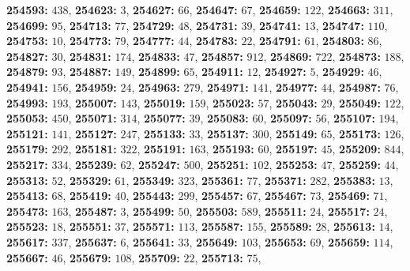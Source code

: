 \textsf{\bfseries 254593:} $438$, \textsf{\bfseries 254623:} $3$, \textsf{\bfseries 254627:} $66$, \textsf{\bfseries 254647:} $67$, \textsf{\bfseries 254659:} $122$, \textsf{\bfseries 254663:} $311$, \textsf{\bfseries 254699:} $95$, \textsf{\bfseries 254713:} $77$, \textsf{\bfseries 254729:} $48$, \textsf{\bfseries 254731:} $39$, \textsf{\bfseries 254741:} $13$, \textsf{\bfseries 254747:} $110$, \textsf{\bfseries 254753:} $10$, \textsf{\bfseries 254773:} $79$, \textsf{\bfseries 254777:} $44$, \textsf{\bfseries 254783:} $22$, \textsf{\bfseries 254791:} $61$, \textsf{\bfseries 254803:} $86$, \textsf{\bfseries 254827:} $30$, \textsf{\bfseries 254831:} $174$, \textsf{\bfseries 254833:} $47$, \textsf{\bfseries 254857:} $912$, \textsf{\bfseries 254869:} $722$, \textsf{\bfseries 254873:} $188$, \textsf{\bfseries 254879:} $93$, \textsf{\bfseries 254887:} $149$, \textsf{\bfseries 254899:} $65$, \textsf{\bfseries 254911:} $12$, \textsf{\bfseries 254927:} $5$, \textsf{\bfseries 254929:} $46$, \textsf{\bfseries 254941:} $156$, \textsf{\bfseries 254959:} $24$, \textsf{\bfseries 254963:} $279$, \textsf{\bfseries 254971:} $141$, \textsf{\bfseries 254977:} $44$, \textsf{\bfseries 254987:} $76$, \textsf{\bfseries 254993:} $193$, \textsf{\bfseries 255007:} $143$, \textsf{\bfseries 255019:} $159$, \textsf{\bfseries 255023:} $57$, \textsf{\bfseries 255043:} $29$, \textsf{\bfseries 255049:} $122$, \textsf{\bfseries 255053:} $450$, \textsf{\bfseries 255071:} $314$, \textsf{\bfseries 255077:} $39$, \textsf{\bfseries 255083:} $60$, \textsf{\bfseries 255097:} $56$, \textsf{\bfseries 255107:} $194$, \textsf{\bfseries 255121:} $141$, \textsf{\bfseries 255127:} $247$, \textsf{\bfseries 255133:} $33$, \textsf{\bfseries 255137:} $300$, \textsf{\bfseries 255149:} $65$, \textsf{\bfseries 255173:} $126$, \textsf{\bfseries 255179:} $292$, \textsf{\bfseries 255181:} $322$, \textsf{\bfseries 255191:} $163$, \textsf{\bfseries 255193:} $60$, \textsf{\bfseries 255197:} $45$, \textsf{\bfseries 255209:} $844$, \textsf{\bfseries 255217:} $334$, \textsf{\bfseries 255239:} $62$, \textsf{\bfseries 255247:} $500$, \textsf{\bfseries 255251:} $102$, \textsf{\bfseries 255253:} $47$, \textsf{\bfseries 255259:} $44$, \textsf{\bfseries 255313:} $52$, \textsf{\bfseries 255329:} $61$, \textsf{\bfseries 255349:} $323$, \textsf{\bfseries 255361:} $77$, \textsf{\bfseries 255371:} $282$, \textsf{\bfseries 255383:} $13$, \textsf{\bfseries 255413:} $68$, \textsf{\bfseries 255419:} $40$, \textsf{\bfseries 255443:} $299$, \textsf{\bfseries 255457:} $67$, \textsf{\bfseries 255467:} $73$, \textsf{\bfseries 255469:} $71$, \textsf{\bfseries 255473:} $163$, \textsf{\bfseries 255487:} $3$, \textsf{\bfseries 255499:} $50$, \textsf{\bfseries 255503:} $589$, \textsf{\bfseries 255511:} $24$, \textsf{\bfseries 255517:} $24$, \textsf{\bfseries 255523:} $18$, \textsf{\bfseries 255551:} $37$, \textsf{\bfseries 255571:} $113$, \textsf{\bfseries 255587:} $155$, \textsf{\bfseries 255589:} $28$, \textsf{\bfseries 255613:} $14$, \textsf{\bfseries 255617:} $337$, \textsf{\bfseries 255637:} $6$, \textsf{\bfseries 255641:} $33$, \textsf{\bfseries 255649:} $103$, \textsf{\bfseries 255653:} $69$, \textsf{\bfseries 255659:} $114$, \textsf{\bfseries 255667:} $46$, \textsf{\bfseries 255679:} $108$, \textsf{\bfseries 255709:} $22$, \textsf{\bfseries 255713:} $75$, 
